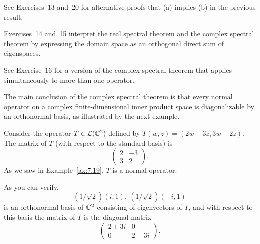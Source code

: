 See Exercises~13 and~20 for alternative proofs that (a) implies (b) in the
previous result.

Exercises~14 and~15 interpret the real spectral theorem and the complex
spectral theorem by expressing the domain space as an orthogonal direct sum of
eigenspaces.

See Exercise~16 for a version of the complex spectral theorem that applies
simultaneously to more than one operator.

The main conclusion of the complex spectral theorem is that every normal
operator on a complex finite-dimensional inner product space is diagonalizable
by an orthonormal basis, as illustrated by the next example.

\begin{example}%
\label{ax:7.33}
Consider the operator $T\in\mathcal{L}(\mathbb{C}^2)$ defined by $T(w,z)=(2w-3z,3w+2z)$. The
matrix of $T$ (with respect to the standard basis) is
\[ \begin{pmatrix} 2 & -3\\ 3 & 2 \end{pmatrix}. \]
As we saw in Example~\ref{ax:7.19}, $T$ is a normal operator.

As you can verify,
\[ (1/\sqrt2)(i,1),\ (1/\sqrt2)(-i,1) \]
is an orthonormal basis of $\mathbb{C}^2$ consisting of eigenvectors of $T$, and with
respect to this basis the matrix of $T$ is the diagonal matrix
\[ \begin{pmatrix} 2+3i & 0\\ 0 & 2-3i \end{pmatrix}. \]
\end{example}

